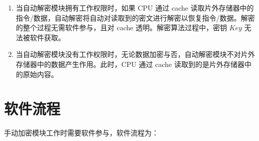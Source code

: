 \documentclass[main\_\_CN.tex]{subfiles}
\begin{document}
\begin{tiplisting}
\vspace{-2em}
\begin{enumerate}

\item 当自动解密模块拥有工作权限时，如果 CPU 通过 cache 读取片外存储器中的指令/数据，自动解密将自动对读取到的密文进行解密以恢复指令/数据。解密的整个过程无需软件参与，且对 cache 透明。解密算法过程中，密钥 \begin{math}\mathit{Key}\end{math} 无法被软件获取。

\item 当自动解密模块没有工作权限时，无论数据加密与否，自动解密模块不对片外存储器中的数据产生作用。此时，CPU 通过 cache 读取到的是片外存储器中的原始内容。

\end{enumerate}
\end{tiplisting}


\section{软件流程}
手动加密模块工作时需要软件参与，软件流程为：
\end{document}
